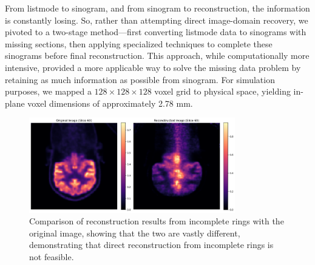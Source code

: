 \documentclass[aps,prb,preprint,groupedaddress,showkeys]{revtex4}
\begin{document}



From listmode to sinogram, and from sinogram to reconstruction, the information is constantly losing. So, rather than attempting direct image-domain recovery, we pivoted to a two-stage method—first converting listmode data to sinograms with missing sections, then applying specialized techniques to complete these sinograms before final reconstruction. This approach, while computationally more intensive, provided a more applicable way to solve the missing data problem by retaining as much information as possible from sinogram.
For simulation purposes, we mapped a $128\times128\times128$ voxel grid to physical space, yielding in-plane voxel dimensions of approximately 2.78 mm.


\begin{figure}[htbp]
    \centering
    \vspace{-0.2cm}
    \includegraphics[width=0.8\textwidth]{Images/output2}
    \vspace{-0.2cm}
    \caption{Comparison of reconstruction results from incomplete rings with the original image, showing that the two are vastly different, demonstrating that direct reconstruction from incomplete rings is not feasible.}
    \vspace{-0.2cm}
    \label{fig:pet_incomplete_reconstruction}
\end{figure}
\end{document}
